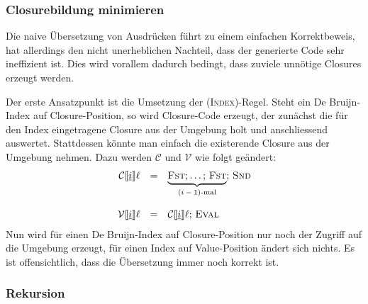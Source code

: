 \documentclass[12pt,fleqn,a4paper]{article}
\newcommand{\RN}[1]{\mbox{\textsc{(#1)}}}
\begin{document}
\subsubsection{Closurebildung minimieren}

Die naive \"Ubersetzung von Ausdr\"ucken f\"uhrt zu einem einfachen Korrektbeweis, hat allerdings den nicht
unerheblichen Nachteil, dass der generierte Code sehr ineffizient ist. Dies wird vorallem dadurch bedingt, dass
zuviele unn\"otige Closures erzeugt werden.

Der erste Ansatzpunkt ist die Umsetzung der \RN{Index}-Regel. Steht ein De Bruijn-Index auf Closure-Position,
so wird Closure-Code erzeugt, der zun\"achst die f\"ur den Index eingetragene Closure aus der Umgebung holt und
anschliessend auswertet. Stattdessen k\"onnte man einfach die existerende Closure aus der Umgebung nehmen. Dazu
werden $\mathcal{C}$ und $\mathcal{V}$ wie folgt ge\"andert:
\[\begin{array}{rcl}
  \mathcal{C}\llbracket \underline{i} \rrbracket\ell
  &=& \underbrace{\textsc{Fst};\ldots;\,\textsc{Fst}}_{\text{$(i-1)$-mal}};\,\textsc{Snd} \\
  \\
  \mathcal{V}\llbracket \underline{i} \rrbracket\ell
  &=& \mathcal{C}\llbracket \underline{i} \rrbracket\ell;\,\textsc{Eval}
\end{array}\]
Nun wird f\"ur einen De Bruijn-Index auf Closure-Position nur noch der Zugriff auf die Umgebung erzeugt,
f\"ur einen Index auf Value-Position \"andert sich nichts. Es ist offensichtlich, dass die \"Ubersetzung
immer noch korrekt ist.


\subsubsection{Rekursion}
\end{document}
